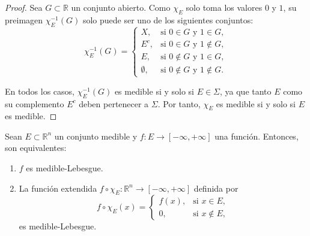\begin{proof}
    Sea $G \subset \mathbb{R}$ un conjunto abierto. Como $\chi_E$ solo toma los valores $0$ y $1$, su preimagen $\chi_E^{-1}(G)$ solo puede ser uno de los siguientes conjuntos:
    \[
        \chi_E^{-1}(G) =
        \begin{cases}
            X,         & \text{si } 0 \in G \text{ y } 1 \in G,       \\
            E^c,       & \text{si } 0 \in G \text{ y } 1 \notin G,    \\
            E,         & \text{si } 0 \notin G \text{ y } 1 \in G,    \\
            \emptyset, & \text{si } 0 \notin G \text{ y } 1 \notin G.
        \end{cases}
    \]

    En todos los casos, $\chi_E^{-1}(G)$ es medible si y solo si $E \in \Sigma$, ya
    que tanto $E$ como su complemento $E^c$ deben pertenecer a $\Sigma$. Por tanto,
    $\chi_E$ es medible si y solo si $E$ es medible.
\end{proof}

\begin{observación}
Sean $E \subset \mathbb{R}^{n}$ un conjunto medible y $f: E \to [-\infty, +\infty]$ una función. Entonces, son equivalentes:
\vspace{-0.5em}
\begin{enumerate}
    \item $f$ es medible-Lebesgue.
    \item La función extendida $f \circ \chi_E : \mathbb{R}^n \to [-\infty, +\infty]$
          definida por
          \[
              f \circ \chi_E(x) =
              \begin{cases}
                  f(x), & \text{si } x \in E,    \\
                  0,    & \text{si } x \notin E,
              \end{cases}
          \]
          es medible-Lebesgue.
\end{enumerate}
\end{observación}

